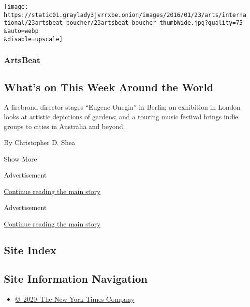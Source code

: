 \begin{enumerate}
  \texttt{[image: https://static01.graylady3jvrrxbe.onion/images/2016/01/23/arts/international/23artsbeat-boucher/23artsbeat-boucher-thumbWide.jpg?quality=75\\\&auto=webp\\\&disable=upscale]}

  \hypertarget{artsbeat}{%
  \subsubsection{ArtsBeat}\label{artsbeat}}

  \hypertarget{whats-on-this-week-around-the-world}{%
  \subsection{What's on This Week Around the
  World}\label{whats-on-this-week-around-the-world}}

  A firebrand director stages ``Eugene Onegin'' in Berlin; an exhibition
  in London looks at artistic depictions of gardens; and a touring music
  festival brings indie groups to cities in Australia and beyond.

  By Christopher D. Shea
\end{enumerate}

Show More

Advertisement

\protect\hyperlink{after-mid1}{Continue reading the main story}

Advertisement

\protect\hyperlink{after-mktg}{Continue reading the main story}

\hypertarget{site-index}{%
\subsection{Site Index}\label{site-index}}

\hypertarget{site-information-navigation}{%
\subsection{Site Information
Navigation}\label{site-information-navigation}}

\begin{itemize}
\tightlist
\item
  \href{https://help.nytimes3xbfgragh.onion/hc/en-us/articles/115014792127-Copyright-notice}{©~2020~The
  New York Times Company}
\end{itemize}

